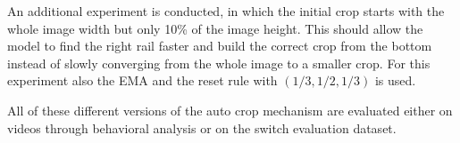 An additional experiment is conducted, in which the initial crop starts with the whole image width but only 10\% of the image height.
This should allow the model to find the right rail faster and build the correct crop from the bottom instead of slowly converging from the whole image to a smaller crop.
For this experiment also the \ac{EMA} and the reset rule with $(1/3, 1/2, 1/3)$ is used.

All of these different versions of the auto crop mechanism are evaluated either on videos through behavioral analysis or on the switch evaluation dataset.

